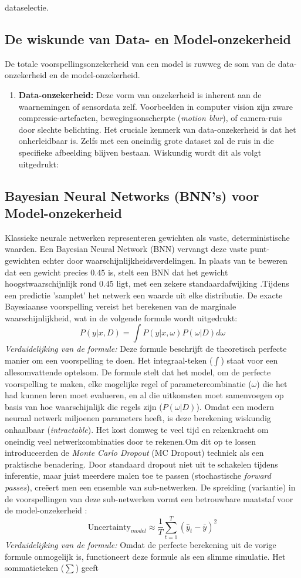 dataselectie.\subsection{De wiskunde van Data- en Model-onzekerheid}De totale voorspellingsonzekerheid van een model is ruwweg de som van de data-onzekerheid en de model-onzekerheid.\begin{enumerate}\item \textbf{Data-onzekerheid:} Deze vorm van onzekerheid is inherent aan de waarnemingen of sensordata zelf. Voorbeelden in computer vision zijn zware compressie-artefacten, bewegingsonscherpte (\textit{motion blur}), of camera-ruis door slechte belichting. Het cruciale kenmerk van data-onzekerheid is dat het onherleidbaar is. Zelfs met een oneindig grote dataset zal de ruis in die specifieke afbeelding blijven bestaan. Wiskundig wordt dit als volgt uitgedrukt:\end{enumerate}\subsection{Bayesian Neural Networks (BNN's) voor Model-onzekerheid}Klassieke neurale netwerken representeren gewichten als vaste, deterministische waarden. Een Bayesian Neural Network (BNN) vervangt deze vaste punt-gewichten echter door waarschijnlijkheidsverdelingen. In plaats van te beweren dat een gewicht precies $0.45$ is, stelt een BNN dat het gewicht hoogstwaarschijnlijk rond $0.45$ ligt, met een zekere standaardafwijking \autocite{blundell2015weight}.Tijdens een predictie 'samplet' het netwerk een waarde uit elke distributie. De exacte Bayesiaanse voorspelling vereist het berekenen van de marginale waarschijnlijkheid, wat in de volgende formule wordt uitgedrukt:$$P(y | x, D) = \int P(y | x, \omega) P(\omega | D) d\omega$$\textit{Verduidelijking van de formule:} Deze formule beschrijft de theoretisch perfecte manier om een voorspelling te doen. Het integraal-teken ($\int$) staat voor een allesomvattende optelsom. De formule stelt dat het model, om de perfecte voorspelling te maken, elke mogelijke regel of parametercombinatie ($\omega$) die het had kunnen leren moet evalueren, en al die uitkomsten moet samenvoegen op basis van hoe waarschijnlijk die regels zijn ($P(\omega | D)$). Omdat een modern neuraal netwerk miljoenen parameters heeft, is deze berekening wiskundig onhaalbaar (\textit{intractable}). Het kost domweg te veel tijd en rekenkracht om oneindig veel netwerkcombinaties door te rekenen.Om dit op te lossen introduceerden \textcite{gal2016dropout} de \textit{Monte Carlo Dropout} (MC Dropout) techniek als een praktische benadering. Door standaard dropout niet uit te schakelen tijdens inferentie, maar juist meerdere malen toe te passen (stochastische \textit{forward passes}), creëert men een ensemble van sub-netwerken. De spreiding (variantie) in de voorspellingen van deze sub-netwerken vormt een betrouwbare maatstaf voor de model-onzekerheid \autocite{jospin2022hands}:$$\text{Uncertainty}_{model} \approx \frac{1}{T} \sum_{t=1}^{T} (\hat{y}_t - \bar{y})^2$$\textit{Verduidelijking van de formule:} Omdat de perfecte berekening uit de vorige formule onmogelijk is, functioneert deze formule als een slimme simulatie. Het sommatieteken ($\sum$) geeft 